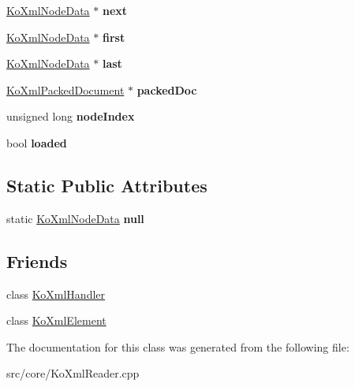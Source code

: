 \begin{DoxyCompactItemize}
\item 
\hypertarget{classKoXmlNodeData_a964517c4cfa6e395e5ac9a4b86fcbe63}{
\hyperlink{classKoXmlNodeData}{KoXmlNodeData} $\ast$ {\bfseries next}}
\label{classKoXmlNodeData_a964517c4cfa6e395e5ac9a4b86fcbe63}

\item 
\hypertarget{classKoXmlNodeData_a1a4f1776dfb09021e18ee5ae74139fc7}{
\hyperlink{classKoXmlNodeData}{KoXmlNodeData} $\ast$ {\bfseries first}}
\label{classKoXmlNodeData_a1a4f1776dfb09021e18ee5ae74139fc7}

\item 
\hypertarget{classKoXmlNodeData_a9f1f22e5194ffc5c0fd5f8f6990bf232}{
\hyperlink{classKoXmlNodeData}{KoXmlNodeData} $\ast$ {\bfseries last}}
\label{classKoXmlNodeData_a9f1f22e5194ffc5c0fd5f8f6990bf232}

\item 
\hypertarget{classKoXmlNodeData_a8ad36bc30324d12d9546a3990355c57f}{
\hyperlink{classKoXmlPackedDocument}{KoXmlPackedDocument} $\ast$ {\bfseries packedDoc}}
\label{classKoXmlNodeData_a8ad36bc30324d12d9546a3990355c57f}

\item 
\hypertarget{classKoXmlNodeData_a9fe7ab18bc8d19fb078c65db4b88c8cf}{
unsigned long {\bfseries nodeIndex}}
\label{classKoXmlNodeData_a9fe7ab18bc8d19fb078c65db4b88c8cf}

\item 
\hypertarget{classKoXmlNodeData_ad559e9abfe40fe771916c45875a606ca}{
bool {\bfseries loaded}}
\label{classKoXmlNodeData_ad559e9abfe40fe771916c45875a606ca}

\end{DoxyCompactItemize}
\subsection*{Static Public Attributes}
\begin{DoxyCompactItemize}
\item 
\hypertarget{classKoXmlNodeData_a13719165a849493e490b660fc85ecec2}{
static \hyperlink{classKoXmlNodeData}{KoXmlNodeData} {\bfseries null}}
\label{classKoXmlNodeData_a13719165a849493e490b660fc85ecec2}

\end{DoxyCompactItemize}
\subsection*{Friends}
\begin{DoxyCompactItemize}
\item 
\hypertarget{classKoXmlNodeData_adea0ec180f7fd7cfb2b2a9d021dbd2b7}{
class \hyperlink{classKoXmlNodeData_adea0ec180f7fd7cfb2b2a9d021dbd2b7}{KoXmlHandler}}
\label{classKoXmlNodeData_adea0ec180f7fd7cfb2b2a9d021dbd2b7}

\item 
\hypertarget{classKoXmlNodeData_a2a307116141db1c847c3e6a167bb92be}{
class \hyperlink{classKoXmlNodeData_a2a307116141db1c847c3e6a167bb92be}{KoXmlElement}}
\label{classKoXmlNodeData_a2a307116141db1c847c3e6a167bb92be}

\end{DoxyCompactItemize}


The documentation for this class was generated from the following file:\begin{DoxyCompactItemize}
\item 
src/core/KoXmlReader.cpp\end{DoxyCompactItemize}
